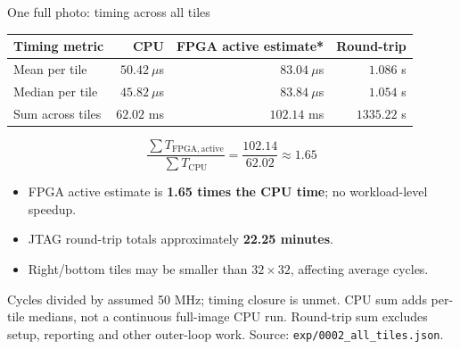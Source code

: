 \documentclass[aspectratio=169,10pt]{beamer}
\begin{document}
\begin{frame}{One full photo: timing across all tiles}
\begin{center}
\begin{tabular}{lrrr}
\toprule
\textbf{Timing metric} & \textbf{CPU} & \textbf{FPGA active estimate*} & \textbf{Round-trip} \\
\midrule
Mean per tile & $50.42\ \mu$s & $83.04\ \mu$s & $1.086$ s \\
Median per tile & $45.82\ \mu$s & $83.84\ \mu$s & $1.054$ s \\
Sum across tiles & $62.02$ ms & $102.14$ ms & $1335.22$ s \\
\bottomrule
\end{tabular}
\end{center}
\[
\frac{\sum T_{\mathrm{FPGA,active}}}{\sum T_{\mathrm{CPU}}}
=\frac{102.14}{62.02}\approx1.65
\]
\begin{itemize}
\item FPGA active estimate is \textbf{1.65 times the CPU time}; no workload-level speedup.
\item JTAG round-trip totals approximately \textbf{22.25 minutes}.
\item Right/bottom tiles may be smaller than $32\times32$, affecting average cycles.
\end{itemize}
\scriptsize *Cycles divided by assumed 50 MHz; timing closure is unmet. CPU sum adds per-tile medians, not a continuous full-image CPU run. Round-trip sum excludes setup, reporting and other outer-loop work. Source: \texttt{exp/0002\_all\_tiles.json}.
\end{frame}
\end{document}
